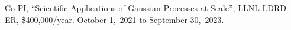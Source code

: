 \item Co-PI,
	``Scientific Applications of Gaussian Processes at Scale'',
	LLNL LDRD ER,
	\$400,000/year.
	October 1,~2021 to September 30,~2023.
